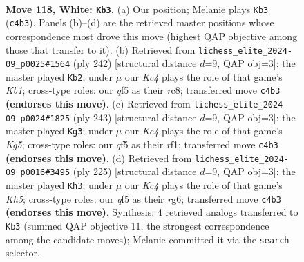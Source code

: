 \documentclass[11pt]{article}
\begin{document}
\clearpage

\begin{figure}[p]\centering
\begin{subfigure}{0.46\textwidth}\centering
\resizebox{\linewidth}{!}{%
\newchessgame
\chessboard[
  setfen={3B4/k7/8/5q2/1NK5/8/8/8 w - - 4 118},
  showmover=false,
  pgfstyle=straightmove, color=movearrow, markmove={c4-b3}
]}
\caption{}
\end{subfigure}\hfill
\begin{subfigure}{0.46\textwidth}\centering
\resizebox{\linewidth}{!}{%
\newchessgame
\chessboard[
  setfen={2r5/8/8/8/8/8/N2k4/1K6 w - - 98 122},
  showmover=false,
  pgfstyle=straightmove, color=movearrow, markmove={b1-b2}
]}
\caption{}
\end{subfigure}
\\[4pt]
\begin{subfigure}{0.46\textwidth}\centering
\resizebox{\linewidth}{!}{%
\newchessgame
\chessboard[
  setfen={8/8/8/8/6k1/4K2n/8/5R2 b - - 3 122},
  showmover=false,
  pgfstyle=straightmove, color=movearrow, markmove={g4-g3}
]}
\caption{}
\end{subfigure}\hfill
\begin{subfigure}{0.46\textwidth}\centering
\resizebox{\linewidth}{!}{%
\newchessgame
\chessboard[
  setfen={8/8/6R1/7n/7k/4K3/8/8 b - - 79 113},
  showmover=false,
  pgfstyle=straightmove, color=movearrow, markmove={h4-h3}
]}
\caption{}
\end{subfigure}
\caption{\textbf{Move 118, White: \texttt{Kb3}.} (a) Our position; Melanie plays \texttt{Kb3} (\texttt{c4b3}). Panels (b)--(d) are the retrieved master positions whose correspondence most drove this move (highest QAP objective among those that transfer to it). (b) Retrieved from \texttt{lichess\_elite\_2024-09\_p0025\#1564} (ply 242) [structural distance $d$=9, QAP obj=3]: the master played \texttt{Kb2}; under $\mu$ our \emph{Kc4} plays the role of that game's \emph{Kb1}; cross-type roles: our \emph{q}f5 as their \emph{r}c8; transferred move \texttt{c4b3} \textbf{(endorses this move)}. (c) Retrieved from \texttt{lichess\_elite\_2024-09\_p0024\#1825} (ply 243) [structural distance $d$=9, QAP obj=3]: the master played \texttt{Kg3}; under $\mu$ our \emph{Kc4} plays the role of that game's \emph{Kg5}; cross-type roles: our \emph{q}f5 as their \emph{r}f1; transferred move \texttt{c4b3} \textbf{(endorses this move)}. (d) Retrieved from \texttt{lichess\_elite\_2024-09\_p0016\#3495} (ply 225) [structural distance $d$=9, QAP obj=3]: the master played \texttt{Kh3}; under $\mu$ our \emph{Kc4} plays the role of that game's \emph{Kh5}; cross-type roles: our \emph{q}f5 as their \emph{r}g6; transferred move \texttt{c4b3} \textbf{(endorses this move)}. Synthesis: 4 retrieved analogs transferred to \texttt{Kb3} (summed QAP objective 11, the strongest correspondence among the candidate moves); Melanie committed it via the \texttt{search} selector.}
\label{fig:thought-m234}
\end{figure}
\end{document}
